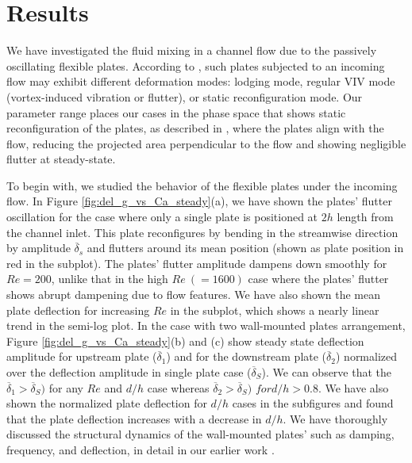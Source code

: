 \documentclass[reprint,a4paper,fleqn]{cas-dc} %
\begin{document}
		\section{Results}

		We have investigated the fluid mixing in a channel flow due to the passively oscillating flexible plates. According to \cite{Zhang2020}, such plates subjected to an incoming flow may exhibit different deformation modes: lodging mode, regular VIV mode (vortex-induced vibration or flutter), or static reconfiguration mode. Our parameter range places our cases in the phase space that shows static reconfiguration of the plates, as described in \cite{Zhang2020}, where the plates align with the flow, reducing the projected area perpendicular to the flow and showing negligible flutter at steady-state.

		To begin with, we studied the behavior of the flexible plates under the incoming flow. 
		In Figure \ref{fig:del_g_vs_Ca_steady}(a), we have shown the plates' flutter oscillation for the case where only a single plate is positioned at $2h$ length from the channel inlet. This plate reconfigures by bending in the streamwise direction by amplitude $\overline{\delta}_s$ and flutters around its mean position (shown as plate position in red in the subplot). The plates' flutter amplitude dampens down smoothly for $Re=200$, unlike that in the high $Re ~(=1600)$ case where the plates' flutter shows abrupt dampening due to flow features. We have also shown the mean plate deflection for increasing $Re$ in the subplot, which shows a nearly linear trend in the semi-log plot. In the case with two wall-mounted plates arrangement, Figure \ref{fig:del_g_vs_Ca_steady}(b) and (c) show steady state deflection amplitude for upstream plate ($\overline{\delta}_1$) and for the downstream plate ($\overline{\delta}_2$) normalized over the deflection amplitude in single plate case ($\overline{\delta}_S$). We can observe that the $\overline{\delta}_1 > \overline{\delta}_S)$ for any $Re$ and $d/h$ case whereas $\overline{\delta}_2 > \overline{\delta}_S)$ $for d/h>0.8$. We have also shown the normalized plate deflection for $d/h$ cases in the subfigures and found that the plate deflection increases with a decrease in $d/h$. We have thoroughly discussed the structural dynamics of the wall-mounted plates' such as damping, frequency, and deflection, in detail in our earlier work \citep{Self2019}.
\end{document}
